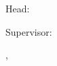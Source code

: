 
\begin{titlepage}


%

\begin{center}
~
\vfill\vfill\vfill

\myauthor

\vfill

{\LARGE\bfseries\mytitle}

\vfill

\mysubject

\vfill\vfill\vfill

{\bfseries\myworktitle}

\vfill\vfill\vfill
\vfill\vfill\vfill
\vfill\vfill\vfill
\vfill\vfill\vfill
\vfill\vfill\vfill


\myuniversity

\vfill

\myinstitute\\
Head: \myinstitutehead\\

\vfill

Supervisor: \mysupervisor\\

\vfill

\mysubmissiontown, \mysubmissionmonth~\mysubmissionyear

\end{center}
\end{titlepage}

\newpage

